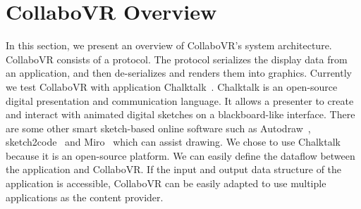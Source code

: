 \documentclass{sigchi}
\begin{document}

\section{CollaboVR Overview}
In this section, we present an overview of CollaboVR's system architecture. CollaboVR consists of a protocol. The protocol serializes the display data from an application, and then de-serializes and renders them into graphics. Currently we test CollaboVR with application Chalktalk~\cite{perlin2018chalktalk}. Chalktalk is an open-source digital presentation and communication language. It allows a presenter to create and interact with animated digital sketches on a blackboard-like interface. There are some other smart sketch-based online software such as Autodraw~\cite{Autodraw}, sketch2code~\cite{Sketch2code} and Miro~\cite{Miro} which can assist drawing. We chose to use Chalktalk because it is an open-source platform. We can easily define the dataflow between the application and CollaboVR. If the input and output data structure of the application is accessible, CollaboVR can be easily adapted to use multiple applications as the content provider.
\end{document}
